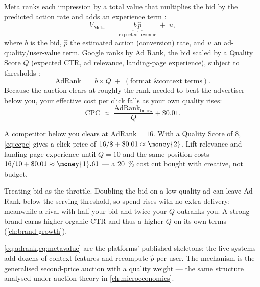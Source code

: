 \begin{derivation}
Meta ranks each impression by a total value that multiplies the bid by the predicted action rate and adds an experience term \parencite{metadev-advantage-campaigns}:
\begin{equation}\label{eq:metavalue}
  V_{\text{Meta}} \;=\; \underbrace{b\,\hat p}_{\text{expected revenue}} \;+\; u,
\end{equation}
where $b$ is the bid, $\hat p$ the estimated action (conversion) rate, and $u$ an ad-quality/user-value term. Google ranks by Ad Rank, the bid scaled by a Quality Score $Q$ (expected CTR, ad relevance, landing-page experience), subject to thresholds \parencite{gads1722122,gads7634668}:
\begin{equation}\label{eq:adrank}
  \mathrm{AdRank} \;=\; b \times Q \;+\;(\text{format \& context terms}).
\end{equation}
Because the auction clears at roughly the rank needed to beat the advertiser below you, your effective cost per click falls as your own quality rises:
\begin{equation}\label{eq:ecpc}
  \mathrm{CPC} \;\approx\; \frac{\mathrm{AdRank}_{\text{below}}}{Q} + \$0.01 .
\end{equation}
\end{derivation}

\begin{worked}
A competitor below you clears at $\mathrm{AdRank}=16$. With a Quality Score of $8$, \cref{eq:ecpc} gives a click price of $16/8+\$0.01\approx\money{2}$. Lift relevance and landing-page experience until $Q=10$ and the same position costs $16/10+\$0.01\approx\money{1}.61$ --- a \qty{20}{\percent} cost cut bought with creative, not budget.
\end{worked}

\begin{trap}
Treating bid as the throttle. Doubling the bid on a low-quality ad can leave Ad Rank below the serving threshold, so spend rises with no extra delivery; meanwhile a rival with half your bid and twice your $Q$ outranks you. A strong brand earns higher organic CTR and thus a higher $Q$ on its own terms (\cref{ch:brand-growth}).
\end{trap}

\begin{deeper}
\cref{eq:adrank,eq:metavalue} are the platforms' published skeletons; the live systems add dozens of context features and recompute $\hat p$ per user. The mechanism is the generalised second-price auction with a quality weight --- the same structure analysed under auction theory in \cref{ch:microeconomics}.
\end{deeper}

